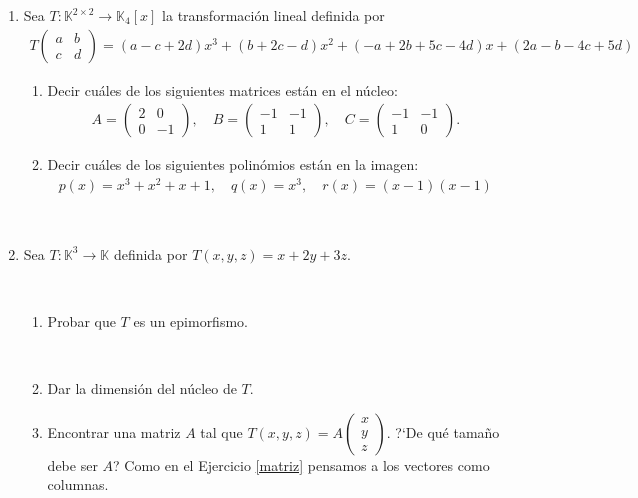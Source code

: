 \documentclass[12pt]{amsart}
\begin{document}
\begin{enumerate}[resume, topsep=5pt,itemsep=5pt]
	\item Sea $T:\mathbb{K}^{2\times 2}\longrightarrow\mathbb{K}_{4}[x]$ la transformaci\'on lineal definida por
\begin{align*}
T\left(\begin{array}{cc}
 a&b\\c&d
  \end{array}
\right)=
(a-c+2d)x^3+(b+2c-d)x^2+
(-a+2b+5c-4d)x+(2a-b-4c+5d)
\end{align*}
\begin{enumerate}
 \item Decir cu\'ales de los siguientes matrices est\'an en el n\'ucleo:
 \begin{align*}
 A=\left(\begin{array}{rr}
    2&0\\0&-1
   \end{array}
   \right),
   \quad
   B=\left(\begin{array}{rr}
    -1&-1\\1&1
   \end{array}
   \right),
   \quad
   C=\left(\begin{array}{rr}
    -1&-1\\1&0
   \end{array}
   \right).
 \end{align*}

 \item Decir cu\'ales de los siguientes polin\'omios est\'an en la imagen:
 \begin{align*}
 p(x)=x^3+x^2+x+1,\quad q(x)=x^3, \quad r(x)=(x-1)(x-1) 
 \end{align*}

\end{enumerate}

\

\item\label{funcional ej}  Sea $T:\mathbb{K}^3\longrightarrow\mathbb{K}$ definida por $T(x,y,z)=x+2y+3z$.

\

\begin{enumerate}
 \item Probar que $T$ es un epimorfismo.
 
 \
 
 \item Dar la dimensi\'on del n\'ucleo de $T$.
 
 
 \item Encontrar una matriz $A$ tal que
     $T(x,y,z)=A\left(\begin{matrix}
	x\\y\\z \end{matrix}
	\right)$. ?`De qu\'e tama\~no debe ser $A$? Como en el Ejercicio \eqref{matriz} pensamos a los vectores como columnas. 
\end{enumerate}
\


\end{enumerate}
\end{document}
